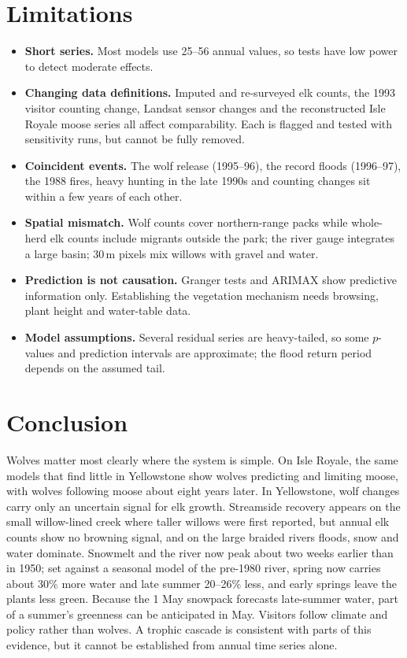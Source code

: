 \documentclass[11pt,a4paper]{article}
\begin{document}
\section{Limitations}
\begin{itemize}
\item \textbf{Short series.} Most models use 25--56 annual values, so tests have low power to detect moderate effects.
\item \textbf{Changing data definitions.} Imputed and re-surveyed elk counts, the 1993 visitor counting change, Landsat sensor changes and the reconstructed Isle Royale moose series all affect comparability. Each is flagged and tested with sensitivity runs, but cannot be fully removed.
\item \textbf{Coincident events.} The wolf release (1995--96), the record floods (1996--97), the 1988 fires, heavy hunting in the late 1990s and counting changes sit within a few years of each other.
\item \textbf{Spatial mismatch.} Wolf counts cover northern-range packs while whole-herd elk counts include migrants outside the park; the river gauge integrates a large basin; 30\,m pixels mix willows with gravel and water.
\item \textbf{Prediction is not causation.} Granger tests and ARIMAX show predictive information only. Establishing the vegetation mechanism needs browsing, plant height and water-table data.
\item \textbf{Model assumptions.} Several residual series are heavy-tailed, so some $p$-values and prediction intervals are approximate; the flood return period depends on the assumed tail.
\end{itemize}

\section{Conclusion}
Wolves matter most clearly where the system is simple. On Isle Royale, the same models that find little in Yellowstone show wolves predicting and limiting moose, with wolves following moose about eight years later. In Yellowstone, wolf changes carry only an uncertain signal for elk growth. Streamside recovery appears on the small willow-lined creek where taller willows were first reported, but annual elk counts show no browning signal, and on the large braided rivers floods, snow and water dominate. Snowmelt and the river now peak about two weeks earlier than in 1950; set against a seasonal model of the pre-1980 river, spring now carries about 30\% more water and late summer 20--26\% less, and early springs leave the plants less green. Because the 1 May snowpack forecasts late-summer water, part of a summer's greenness can be anticipated in May. Visitors follow climate and policy rather than wolves. A trophic cascade is consistent with parts of this evidence, but it cannot be established from annual time series alone.
\end{document}

